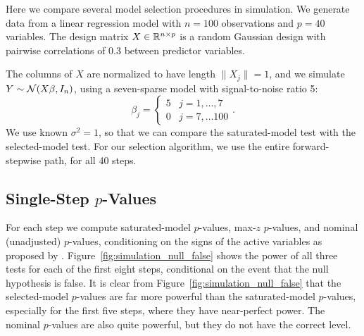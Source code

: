 \documentclass{article}
\begin{document}
Here we compare several model selection procedures in simulation. We generate data from a linear regression model with $n=100$ observations and $p=40$ variables. The design matrix $X\in\mathbb{R}^{n\times p}$ is a random Gaussian design with pairwise correlations of 0.3 between predictor variables.

The columns of $X$ are normalized to have length $\|X_j\|=1$, and we simulate $Y \sim \mathcal{N}(X\beta,I_n)$, using a seven-sparse model with signal-to-noise ratio 5:
\[
\beta_j = \left\{\begin{matrix}5 & j = 1,\ldots,7\\ 0 &
    j = 7,\ldots 100 \end{matrix}\right. .
\]
We use known $\sigma^2=1$, so that we can compare the saturated-model test with the selected-model test. For our selection algorithm, we use the entire forward-stepwise path, for all 40 steps. 

\subsection{Single-Step $p$-Values}

For each step we compute saturated-model $p$-values, max-$z$ $p$-values, and nominal (unadjusted) $p$-values, conditioning on the signs of the active variables as proposed by \citet{lee2013exact}. Figure~\ref{fig:simulation_null_false} shows the power of all three tests for each of the first eight steps, conditional on the event that the null hypothesis is false. It is clear from Figure~\ref{fig:simulation_null_false} that the selected-model $p$-values are far more powerful than the saturated-model $p$-values, especially for the first five steps, where they have near-perfect power. The nominal $p$-values are also quite powerful, but they do not have the correct level.
\end{document}
